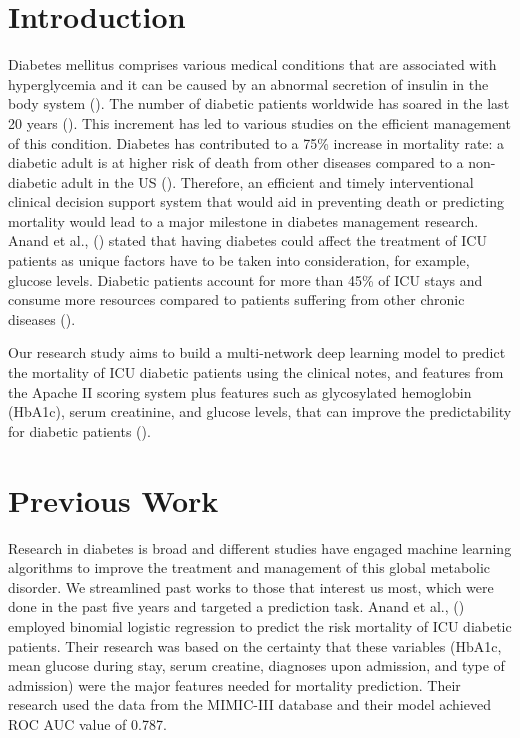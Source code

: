 \documentclass{sigkddExp}
\begin{document}
\section{Introduction}
Diabetes mellitus comprises various medical conditions that are associated with hyperglycemia and it can 
be caused by an abnormal secretion of insulin in the body system (\cite{egan}). 
The number of diabetic patients worldwide has soared in the last 20 years (\cite{zimmet}). 
This increment has led to various studies on the efficient management of this condition. 
Diabetes has contributed to a 75\% increase in mortality rate:
a diabetic adult is at higher risk of death from other diseases compared to a 
non-diabetic adult in the US (\cite{gregg}). Therefore,
an efficient and timely interventional clinical decision support system that 
would aid in preventing death or predicting mortality would 
lead to a major milestone in diabetes management research. Anand et al., (\cite{anand}) stated 
that having diabetes could affect the treatment 
of ICU patients as unique factors have to be taken into consideration, for example,
glucose levels. Diabetic patients account for more than 45\% of ICU stays and consume 
more resources compared to patients suffering from 
other chronic diseases (\cite{anand}). 
 
Our research study aims to build a multi-network deep learning model to predict the mortality 
of ICU diabetic patients using the clinical notes,
and features from the Apache II scoring system plus features such as glycosylated hemoglobin (HbA1c),
serum creatinine, and glucose levels, that can improve the predictability for diabetic patients (\cite{anand}).

\section{Previous Work}
Research in diabetes is broad and different studies have engaged machine learning algorithms to improve 
the treatment and management of this global metabolic disorder. We streamlined past works to those that 
interest us most, which were done in the past five years and targeted a prediction task.
Anand et al., (\cite{anand}) employed binomial logistic regression to predict the risk mortality of ICU diabetic patients.  
Their research was based on the certainty that these variables (HbA1c, mean glucose during stay, serum creatine, 
diagnoses upon admission, and type of admission) were the major features needed for mortality prediction. 
Their research used the data from the MIMIC-III database and their model achieved ROC AUC value of 0.787.
\end{document}
